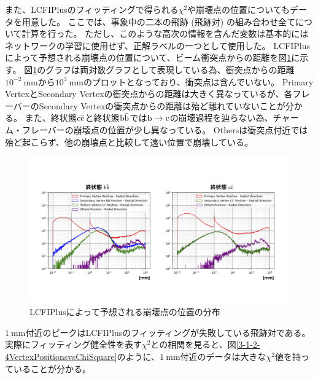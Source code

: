 また、LCFIPlusのフィッティングで得られる$\chi^2$や崩壊点の位置についてもデータを用意した。
ここでは、事象中の二本の飛跡 (飛跡対) の組み合わせ全てについて計算を行った。
ただし、このような高次の情報を含んだ変数は基本的にはネットワークの学習に使用せず、正解ラベルの一つとして使用した。
LCFIPlusによって予想される崩壊点の位置について、ビーム衝突点からの距離を図\ref{3-1-2-3VertexPositions}に示す。
図\ref{3-1-2-3VertexPositions}のグラフは両対数グラフとして表現している為、衝突点からの距離$10^{-2}\ \mathrm{mm}$から$10^{3}\ \mathrm{mm}$のプロットとなっており、衝突点は含んでいない。
Primary VertexとSecondary Vertexの衝突点からの距離は大きく異なっているが、各フレーバーのSecondary Vertexの衝突点からの距離は殆ど離れていないことが分かる。
また、終状態$\rm c\bar{c}$と終状態$\rm b\bar{b}$では$\rm b \to c$の崩壊過程を辿らない為、チャーム・フレーバーの崩壊点の位置が少し異なっている。
Othersは衝突点付近では殆ど起こらず、他の崩壊点と比較して遠い位置で崩壊している。

\begin{figure}[htbp]
 \centering
 \includegraphics[trim = 50 100 50 150, width=1.0\textwidth, clip]{Figure/3Networks/3-1-2-3VertexPositions.png}
 \caption{LCFIPlusによって予想される崩壊点の位置の分布}
 \label{3-1-2-3VertexPositions}
\end{figure}

$1\ \mathrm{mm}$付近のピークはLCFIPlusのフィッティングが失敗している飛跡対である。
実際にフィッティング健全性を表す$\chi^2$との相関を見ると、図\ref{3-1-2-4VertexPositionsvsChiSquare}のように、$1\ \mathrm{mm}$付近のデータは大きな$\chi^2$値を持っていることが分かる。


